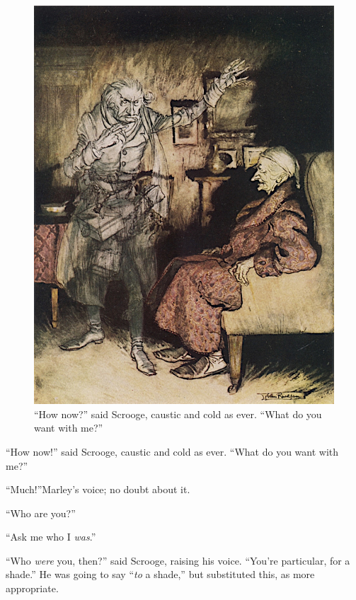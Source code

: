 \documentclass[paper=5.5in:8.5in,BCOR=7mm,twoside,DIV=calc,12pt,usegeometry]{scrbook} %
\begin{document}
\begin{figure}[p]
\begin{minipage}[c]{\linewidth}
\includegraphics[width=\linewidth]{scroogemarley2}
\caption[\enquote{What do you want with me?}]{\enquote{How now?} said Scrooge, caustic and cold as ever. \enquote{What do you want with me?}}
\end{minipage}
\end{figure}

\enquote{How now!} said Scrooge, caustic and cold as ever. \enquote{What do you want with me?}

\enquote{Much!}\textemdash Marley's voice; no doubt about it.

\enquote{Who are you?}

\enquote{Ask me who I \textit{was}.}

\enquote{Who \textit{were} you, then?} said Scrooge, raising his voice. \enquote{You're particular, for a shade.} He was going to say \enquote{\textit{to} a shade,} but substituted this, as more appropriate.
\end{document}
